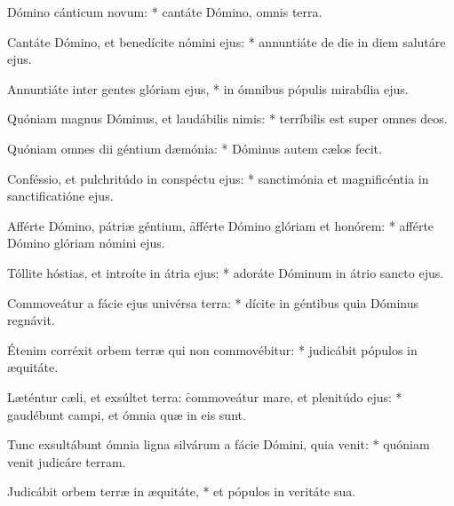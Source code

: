 \begin{psalmus}

     Dómino cánticum novum: * cantáte Dómino, omnis terra.

    Cantáte Dómino, et benedícite nómini ejus: * annuntiáte de die in diem salutáre ejus.

    Annuntiáte inter gentes glóriam ejus, * in ómnibus pópulis mirabília ejus.

    Quóniam magnus Dóminus, et laudábilis nimis: * terríbilis est super omnes deos.

    Quóniam omnes dii géntium dæmónia: * Dóminus autem cælos fecit.

    Conféssio, et pulchritúdo in conspéctu ejus: * sanctimónia et magnificéntia in sanctificatióne ejus.

    Afférte Dómino, pátriæ géntium, \f afférte Dómino glóriam et honórem: * afférte Dómino glóriam nómini ejus.

    Tóllite hóstias, et introíte in átria ejus: * adoráte Dóminum in átrio sancto ejus.

    Commoveátur a fácie ejus univérsa terra: * dícite in géntibus quia Dóminus regnávit.

    Étenim corréxit orbem terræ qui non commovébitur: * judicábit pópulos in æquitáte.

    Læténtur cæli, et exsúltet terra: \f commoveátur mare, et plenitúdo ejus: * gaudébunt campi, et ómnia quæ in eis sunt.

    Tunc exsultábunt ómnia ligna silvárum a fácie Dómini, quia venit: * quóniam venit judicáre terram.

    Judicábit orbem terræ in æquitáte, * et pópulos in veritáte sua.

\end{psalmus}
